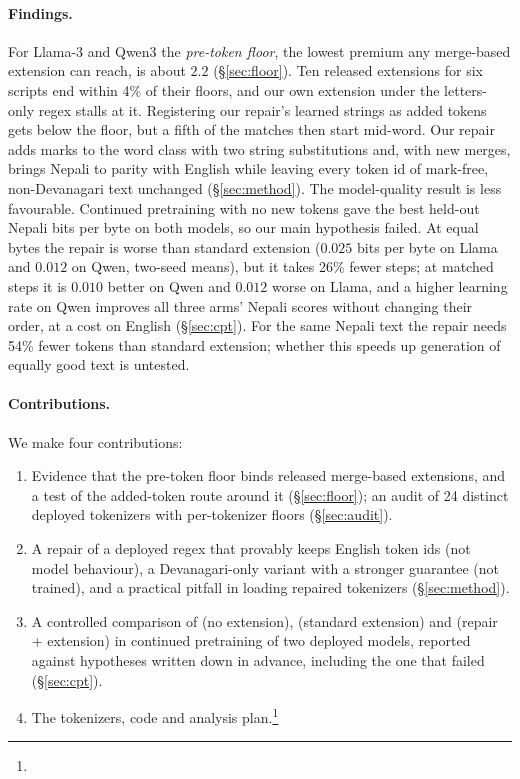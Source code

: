 \paragraph{Findings.} For Llama-3 and Qwen3 the \emph{pre-token floor}, the lowest premium any merge-based extension can reach, is about $2.2$ (\S\ref{sec:floor}). Ten released extensions for six scripts end within 4\% of their floors, and our own extension under the letters-only regex stalls at it. Registering our repair's learned strings as added tokens~\citep[cf.][]{churchill2026reducing} gets below the floor, but a fifth of the matches then start mid-word. Our repair adds marks to the word class with two string substitutions and, with new merges, brings Nepali to parity with English while leaving every token id of mark-free, non-Devanagari text unchanged (\S\ref{sec:method}). The model-quality result is less favourable. Continued pretraining with no new tokens gave the best held-out Nepali bits per byte on both models, so our main hypothesis failed. At equal bytes the repair is worse than standard extension ($0.025$ bits per byte on Llama and $0.012$ on Qwen, two-seed means), but it takes 26\% fewer steps; at matched steps it is $0.010$ better on Qwen and $0.012$ worse on Llama, and a higher learning rate on Qwen improves all three arms' Nepali scores without changing their order, at a cost on English (\S\ref{sec:cpt}). For the same Nepali text the repair needs 54\% fewer tokens than standard extension; whether this speeds up generation of equally good text is untested.

\paragraph{Contributions.} We make four contributions:
\begin{enumerate}
  \setlength\itemsep{0pt}
  \item Evidence that the pre-token floor binds released merge-based extensions, and a test of the added-token route around it (\S\ref{sec:floor}); an audit of 24 distinct deployed tokenizers with per-tokenizer floors (\S\ref{sec:audit}).
  \item A repair of a deployed regex that provably keeps English token ids (not model behaviour), a Devanagari-only variant with a stronger guarantee (not trained), and a practical pitfall in loading repaired tokenizers (\S\ref{sec:method}).
  \item A controlled comparison of \RO{} (no extension), \RI{} (standard extension) and \RII{} (repair + extension) in continued pretraining of two deployed models, reported against hypotheses written down in advance, including the one that failed (\S\ref{sec:cpt}).
  \item The tokenizers, code and analysis plan.\footnote{\artifactnote}
\end{enumerate}
